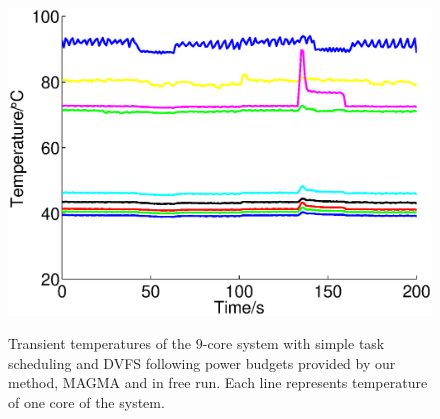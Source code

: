 \begin{figure}[htb]
{    \includegraphics[width=0.8\columnwidth]{fig/tem_free.eps}\label{fig:tem_free}
  }
  \caption{Transient temperatures of the $9$-core system with simple task scheduling and DVFS following power budgets provided by our method, MAGMA and in free run. Each line represents temperature of one core of the system.}
  \label{fig:transient_ppw_temperature}
\end{figure}





